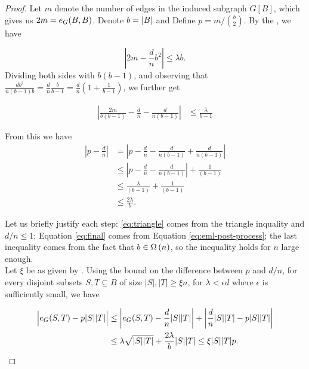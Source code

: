 \documentclass[11pt]{article}
\begin{document}
\begin{proof}
  Let $m$ denote the number of edges in the induced subgraph $G[B]$, which gives us $2m = \CutEdges{B}{B}{G}$.
Denote $b \Def \Size{B}$ and Define $p = m / \binom{b}{2}$. By the , we have

\[ \left| 2m - \frac{d}{n}b^2 \right| \le \lambda b. \]
Dividing both sides with $b(b-1)$, and observing that $\frac{db^2}{n(b-1)b} = \frac{d}{n}\frac{b}{b-1} = \frac{d}{n}(1 + \frac{1}{b-1})$, we further get

\begin{align}
\left| \frac{2m}{b(b-1)} - \frac{d}{n} - \frac{d}{n(b-1)} \right| &\le \frac{\lambda}{b-1}  \label{eq:eml-post-process}
\end{align}

From this we have 
\begin{align}
  \left| p - \frac{d}{n}\right| &= \left| p - \frac{d}{n} - \frac{d}{n(b-1)} + \frac{d}{n(b-1)}\right|  \\
                                &\le \left| p - \frac{d}{n} - \frac{d}{n(b-1)} \right| + \frac{1}{(b-1)} \label{eq:triangle}\\
                                &\le \frac{\lambda}{(b-1)} + \frac{1}{(b-1)}  \label{eq:final} \\
  & \le \frac{2\lambda}{b}. 
\end{align}

Let us briefly justify each step: \eqref{eq:triangle} comes from the triangle inquality and  $d/n \le 1$;
Equation \eqref{eq:final} comes from Equation \eqref{eq:eml-post-process};
the last inequality comes from the fact that $b \in \BigOmega{n}$, so the inequality holds for $n$ large enough.\\

Let $\xi$ be as given by . Using the bound on the difference between $p$ and $d/n$, for every disjoint subsets $S, T \subseteq B$ of size $|S|,|T| \ge \xi n$, for $\lambda < \epsilon d$ where $\epsilon$ is sufficiently small, we have

\begin{align*}
  \Bigl| \CutEdges{S}{T}{G}  - p|S||T| \Bigr| &\le \left| \CutEdges{S}{T}{G} - \frac{d}{n}|S||T| \right| + \left| \frac{d}{n}|S||T| - p|S||T| \right| \\
                                    &\le \lambda \sqrt{|S||T|} + \frac{2 \lambda}{b} |S||T| \le \xi |S||T|p. 
    \end{align*}


\end{proof}
\end{document}
